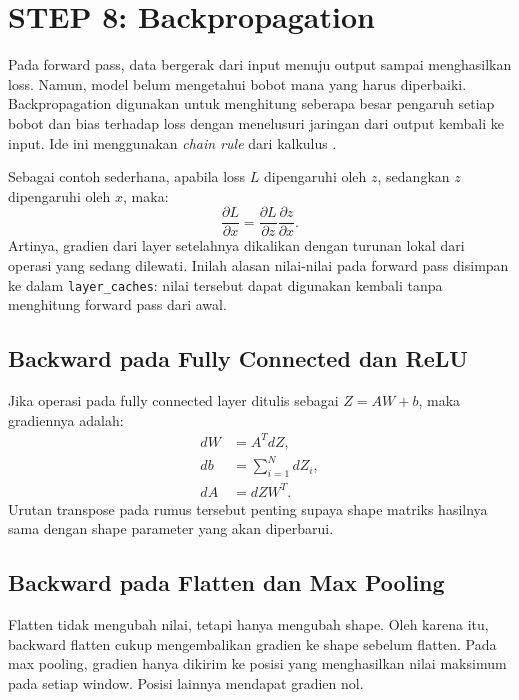 \documentclass[12pt, letterpaper]{article}
\begin{document}
\section*{STEP 8: Backpropagation}
Pada forward pass, data bergerak dari input menuju output sampai menghasilkan loss. Namun, model belum mengetahui bobot mana yang harus diperbaiki. Backpropagation digunakan untuk menghitung seberapa besar pengaruh setiap bobot dan bias terhadap loss dengan menelusuri jaringan dari output kembali ke input. Ide ini menggunakan \textit{chain rule} dari kalkulus \cite{rumelhart1986backprop}.

Sebagai contoh sederhana, apabila loss $L$ dipengaruhi oleh $z$, sedangkan $z$ dipengaruhi oleh $x$, maka:
\begin{equation}
  \frac{\partial L}{\partial x}
  = \frac{\partial L}{\partial z}
    \frac{\partial z}{\partial x}.
\end{equation}
Artinya, gradien dari layer setelahnya dikalikan dengan turunan lokal dari operasi yang sedang dilewati. Inilah alasan nilai-nilai pada forward pass disimpan ke dalam \texttt{layer\_caches}: nilai tersebut dapat digunakan kembali tanpa menghitung forward pass dari awal.

\subsection*{Backward pada Fully Connected dan ReLU}
Jika operasi pada fully connected layer ditulis sebagai $Z=AW+b$, maka gradiennya adalah:
\begin{align}
  dW &= A^{T}dZ,\\
  db &= \sum_{i=1}^{N} dZ_i,\\
  dA &= dZW^{T}.
\end{align}
Urutan transpose pada rumus tersebut penting supaya shape matriks hasilnya sama dengan shape parameter yang akan diperbarui. 

\subsection*{Backward pada Flatten dan Max Pooling}
Flatten tidak mengubah nilai, tetapi hanya mengubah shape. Oleh karena itu, backward flatten cukup mengembalikan gradien ke shape sebelum flatten. Pada max pooling, gradien hanya dikirim ke posisi yang menghasilkan nilai maksimum pada setiap window. Posisi lainnya mendapat gradien nol.
\end{document}
